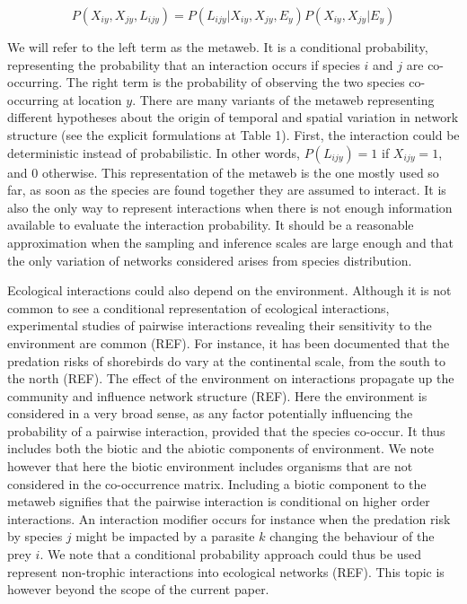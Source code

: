\documentclass[12pt]{article}
\begin{document}
\begin{equation}
P(X_{iy},X_{jy},L_{ijy})=P(L_{ijy}|X_{iy},X_{jy},E_y)P(X_{iy},X_{jy}|E_y)
\end{equation}

We will refer to the left term as the metaweb. It is a conditional
probability, representing the probability that an interaction occurs if
species $i$ and $j$ are co-occurring. The right term is the probability
of observing the two species co-occurring at location $y$. There are many
variants of the metaweb representing different hypotheses about the origin
of temporal and spatial variation in network structure (see the explicit
formulations at Table 1). First, the interaction could be deterministic
instead of probabilistic. In other words, $P(L_{ijy}) = 1$ if $X_{ijy} =
1$, and 0 otherwise. This representation of the metaweb is the one mostly
used so far, as soon as the species are found together they are assumed to
interact. It is also the only way to represent interactions when there is
not enough information available to evaluate the interaction probability. It
should be a reasonable approximation when the sampling and inference scales
are large enough and that the only variation of networks considered arises
from species distribution.

Ecological interactions could also depend on the environment. Although it
is not common to see a conditional representation of ecological interactions,
experimental studies of pairwise interactions revealing their sensitivity to
the environment are common (REF). For instance, it has been documented that the
predation risks of shorebirds do vary at the continental scale, from the south
to the north (REF). The effect of the environment on interactions propagate
up the community and influence network structure (REF). Here the environment
is considered in a very broad sense, as any factor potentially influencing the
probability of a pairwise interaction, provided that the species co-occur. It
thus includes both the biotic and the abiotic components of environment. We
note however that here the biotic environment includes organisms that are
not considered in the co-occurrence matrix. Including a biotic component to
the metaweb signifies that the pairwise interaction is conditional on higher
order interactions. An interaction modifier occurs for instance when the
predation risk by species $j$ might be impacted by a parasite $k$ changing
the behaviour of the prey $i$. We note that a conditional probability approach
could thus be used represent non-trophic interactions into ecological networks
(REF). This topic is however beyond the scope of the current paper.
\end{document}
